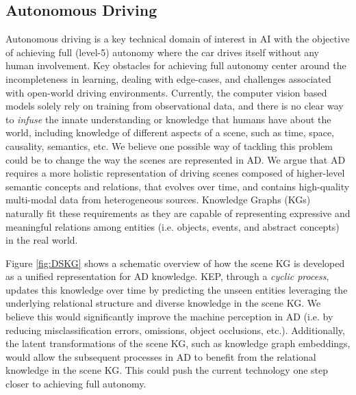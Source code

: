 \documentclass[conference]{IEEEtran}
\begin{document}
\subsection{Autonomous Driving}
Autonomous driving is a key technical domain of interest in AI with the objective of achieving full (level-5) autonomy where the car drives itself without any human involvement. Key obstacles for achieving full autonomy center around the incompleteness in learning, dealing with edge-cases, and challenges associated with open-world driving environments. Currently, the computer vision based models solely rely on training from observational data, and there is no clear way to \textit{infuse} the innate understanding or knowledge that humans have about the world, including knowledge of different aspects of a scene, such as time, space, causality, semantics, etc. We believe one possible way of tackling this problem could be to change the way the scenes are represented in AD. We argue that AD requires a more holistic representation of driving scenes composed of higher-level semantic concepts and relations, that evolves over time, and contains high-quality multi-modal data from heterogeneous sources. Knowledge Graphs (KGs) naturally fit these requirements as they are capable of representing expressive and meaningful relations among entities (i.e. objects, events, and abstract concepts) in the real world.  



Figure \ref{fig:DSKG} shows a schematic overview of how the scene KG is developed as a unified representation for AD knowledge. KEP, through a \textit{cyclic process},  updates this knowledge over time by predicting the unseen entities leveraging the underlying relational structure and diverse knowledge in the scene KG. We believe this would significantly improve the machine perception in AD (i.e. by reducing misclassification errors, omissions, object occlusions, etc.). Additionally, the latent transformations of the scene KG, such as knowledge graph embeddings\cite{wickramarachchi2020evaluation}, would allow the subsequent processes in AD to benefit from the relational knowledge in the scene KG. This could push the current technology one step closer to achieving full autonomy.
\end{document}
